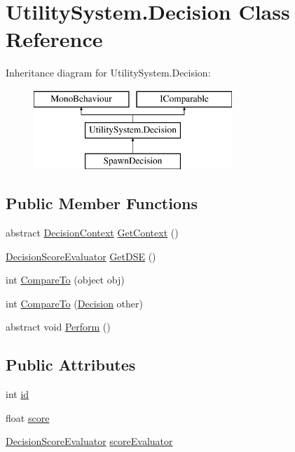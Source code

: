\hypertarget{class_utility_system_1_1_decision}{}\section{Utility\+System.\+Decision Class Reference}
\label{class_utility_system_1_1_decision}
Inheritance diagram for Utility\+System.\+Decision\+:\begin{figure}[H]
\begin{center}
\leavevmode
\includegraphics[height=3.000000cm]{class_utility_system_1_1_decision}
\end{center}
\end{figure}
\subsection*{Public Member Functions}
\begin{DoxyCompactItemize}
\item 
abstract \mbox{\hyperlink{class_utility_system_1_1_decision_context}{Decision\+Context}} \mbox{\hyperlink{class_utility_system_1_1_decision_a46ba8cac39f52c630897a24f2bde6b07}{Get\+Context}} ()
\item 
\mbox{\hyperlink{class_utility_system_1_1_decision_score_evaluator}{Decision\+Score\+Evaluator}} \mbox{\hyperlink{class_utility_system_1_1_decision_a7a544c6d16e25998e64d89d510ab7733}{Get\+D\+SE}} ()
\item 
int \mbox{\hyperlink{class_utility_system_1_1_decision_a35c44bfaa350617cb9c18c6961f66ba8}{Compare\+To}} (object obj)
\item 
int \mbox{\hyperlink{class_utility_system_1_1_decision_ae75bc92f152e31288002e8ed1dfa8084}{Compare\+To}} (\mbox{\hyperlink{class_utility_system_1_1_decision}{Decision}} other)
\item 
abstract void \mbox{\hyperlink{class_utility_system_1_1_decision_a055dcaafb617365bc8b16bb9acba6575}{Perform}} ()
\end{DoxyCompactItemize}
\subsection*{Public Attributes}
\begin{DoxyCompactItemize}
\item 
int \mbox{\hyperlink{class_utility_system_1_1_decision_ac898590add80a922e0dea64906a536fc}{id}}
\item 
float \mbox{\hyperlink{class_utility_system_1_1_decision_a26d318a50cfa8b16f3955ae814516b8d}{score}}
\item 
\mbox{\hyperlink{class_utility_system_1_1_decision_score_evaluator}{Decision\+Score\+Evaluator}} \mbox{\hyperlink{class_utility_system_1_1_decision_aed761a6523b0eb1148c743665fa05789}{score\+Evaluator}}
\end{DoxyCompactItemize}


